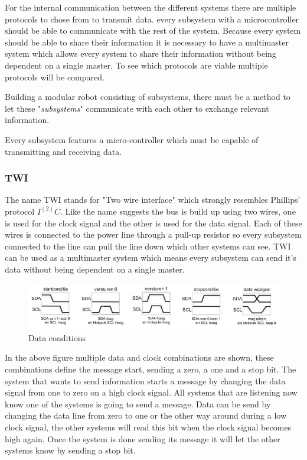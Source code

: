 \documentclass[10pt,a4paper]{article}
\begin{document}
For the internal communication between the different systems there are multiple protocols to chose from to transmit data. every subsystem with a microcontroller should be able to communicate with the rest of the system. Because every system should be able to share their information it is necessary to have a multimaster system which allows every system to share their information without being dependent on a single master. To see which protocols are viable multiple protocols will be compared.

Building a modular robot consisting of subsystems, there must be a method to let these "\textit{subsystems}" communicate with each other to exchange relevant information. 

Every subsystem features a micro-controller which must be capable of transmitting and receiving data.  

\subsubsection{TWI}
The name TWI stands for "Two wire interface" which strongly resembles Phillips' protocol $I^(2)C$. Like the name suggests the bus is build up using two wires, one is used for the clock signal and the other is used for the data signal. Each of these wires is connected to the power line through a pull-up resistor so every subsystem connected to the line can pull the line down which other systems can see. TWI can be used as a multimaster system which means every subsystem can send it's data without being dependent on a single master.



\begin{figure}[H]
        \centering
        \graphicspath{ {./images/} }
        \includegraphics[scale=.6]{datacondities}
        \caption{Data conditions}
        \label{fig:Data conditions}
\end{figure}
In the above figure multiple data and clock combinations are shown, these combinations define the message start, sending a zero, a one and a stop bit. The system that wants to send information starts a message by changing the data signal from one to zero on a high clock signal. All systems that are listening now know one of the systems is going to send a message. Data can be send by changing the data line from zero to one or the other way around during a low clock signal, the other systems will read this bit when the clock signal becomes high again. Once the system is done sending its message it will let the other systems know by sending a stop bit.
\end{document}
